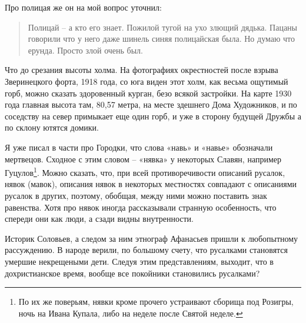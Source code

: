 Про полицая же он на мой вопрос уточнил:

\begin{quotation}
Полицай – а кто его знает. Пожилой тугой на ухо злющий дядька. Пацаны говорили что у него даже шинель синяя полицайская была. Но думаю что ерунда. Просто злой очень был.
\end{quotation}

Что до срезания высоты холма. На фотографиях окр\-естностей после взрыва Зверинецкого форта, 1918 года, со юга виден этот холм, как весьма ощутимый горб, можно сказать здоровенный курган, безо всякой застройки. На карте 1930 года главная высота там, 80,57 метра, на месте здешнего Дома Художников, и по соседству на север примыкает еще один горб, и уже в сторону будущей Дружбы а по склону ютятся домики. 

Я уже писал в части про Городки, что слова «навь» и «навье» обозначали мертвецов. Сходное с этим словом – «нявка» у некоторых Славян, например Гуцулов\footnote{По их же поверьям, нявки кроме прочего устраивают сборища под Розигры, ночь на Ивана Купала, либо на неделе после Святой неделе.}. Можно сказать, что, при всей противоречивости описаний русалок, нявок (мавок), описания нявок в некоторых местностях совпадают с описаниями русалок в других, поэтому, обобщая, между ними можно поставить знак равенства. Хотя про нявок иногда рассказывали странную особенность, что спереди они как люди, а сзади видны внутренности.



Историк Соловьев, а следом за ним этнограф Афанасьев  пришли к любопытному рассуждению. В народе верили, по большому счету, что русалками становятся умершие некрещеными дети. Следуя этим представлениям, выходит, что в дохристианское время, вообще все покойники становились русалками?

